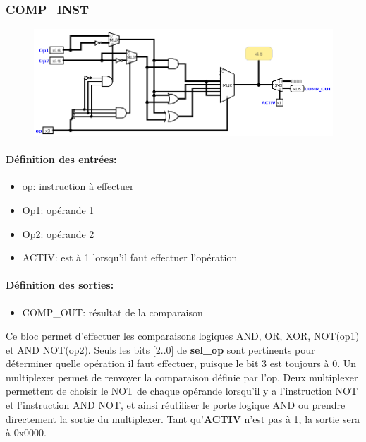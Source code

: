 \documentclass[a4paper]{article} %
\begin{document}
\subsubsection{COMP\_INST} \label{comp_inst}
\begin{figure}[H]
    \centering
    \includegraphics[width=1\textwidth]{src/COMP_INST.png}
    \label{fig:comp_inst_pic}
\end{figure}
\paragraph{Définition des entrées:}
\begin{itemize}
    \item     op: instruction à effectuer
    \item     Op1: opérande 1
    \item     Op2: opérande 2
    \item     ACTIV: est à 1 lorsqu'il faut effectuer l'opération
\end{itemize}

\paragraph{Définition des sorties:}
\begin{itemize}
    \item     COMP\_OUT: résultat de la comparaison
\end{itemize}
\medskip
Ce bloc permet d'effectuer les comparaisons logiques AND, OR, XOR, NOT(op1) et AND NOT(op2). Seuls les bits [2..0] de \textbf{sel\_op} sont pertinents pour déterminer quelle opération il faut effectuer, puisque le bit 3 est toujours à 0. Un multiplexer permet de renvoyer la comparaison définie par l'op. Deux multiplexer permettent de choisir le NOT de chaque opérande lorsqu'il y a l'instruction NOT et l'instruction AND NOT, et ainsi réutiliser le porte logique AND ou prendre directement la sortie du multiplexer. Tant qu'\textbf{ACTIV} n'est pas à 1, la sortie sera à 0x0000.
\end{document}
